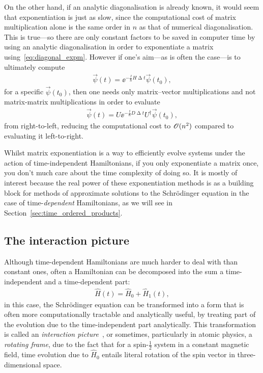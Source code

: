 On the other hand, if an analytic diagonalisation is already known, it would seem that exponentiation is just as slow, since the computational cost of matrix multiplication alone is the same order in $n$ as that of numerical diagonalisation. This is true---so there are only constant factors to be saved in computer time by using an analytic diagonalisation in order to exponentiate a matrix using~\eqref{eq:diagonal_expm}. However if one's aim---as is often the case---is to ultimately compute
\begin{align}
\vec\psi(t) = \ee^{-\frac \ii \hbar H \upDelta t}\vec\psi(t_0),
\end{align}
for a specific $\vec \psi(t_0)$, then one needs only matrix--vector multiplications and not matrix-matrix multiplications in order to evaluate
\begin{align}
\vec\psi(t) = U \ee^{-\frac \ii \hbar D \upDelta t} U^\dagger \vec\psi(t_0),
\end{align}
from right-to-left, reducing the computational cost to $\mathscr{O}(n^2)$ compared to evaluating it left-to-right.

Whilst matrix exponentiation is a way to efficiently evolve systems under the action of time-independent Hamiltonians, if you only exponentiate a matrix once, you don't much care about the time complexity of doing so. It is mostly of interest because the real power of these exponentiation methods is as a building block for methods of approximate solutions to the Schr\"odinger equation in the case of time-\emph{dependent} Hamiltonians, as we will see in Section~\ref{sec:time_ordered_products}.

\subsection{The interaction picture}\label{sec:interaction_picture}

Although time-dependent Hamiltonians are much harder to deal with than constant ones, often a Hamiltonian can be decomposed into the sum a time-independent and a time-dependent part:
\begin{align}
\hat H(t) = \hat H_0 + \hat H_1(t),
\end{align}
in this case, the Schr\"odinger equation can be transformed into a form that is often more computationally tractable and analytically useful, by treating part of the evolution due to the time-independent part analytically. This transformation is called an \emph{interaction picture}~\cite[p.~317]{sakurai}, or sometimes, particularly in atomic physics, a \emph{rotating frame}, due to the fact that for a spin-$\frac12$ system in a constant magnetic field, time evolution due to $\hat H_0$ entails literal rotation of the spin vector in three-dimensional space. 

